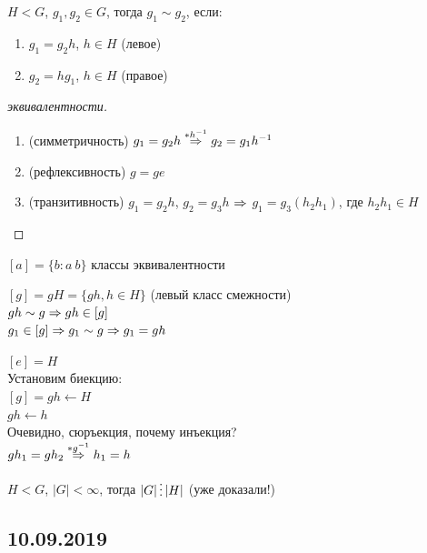 \documentclass[12pt, fleqn]{article}
\begin{document}
\begin{definition}
    $H<G$, $g_1,g_2 \in G$, тогда $g_1 \sim g_2$, если:
    \begin{enumerate}                               
    	\item $g_1=g_2 h$, $h \in H$ (левое)
    	\item $g_2=h g_1$, $h \in H$ (правое)
	\end{enumerate} 
\end{definition}

\begin{proof}[эквивалентности]
    \begin{enumerate}                               
    	\item (симметричность) $g_1=g_2 h \overset{*h^{-1}}{\Rightarrow} g_2 = g_1 h^{-1}$
    	\item (рефлексивность) $g=g e$
    	\item (транзитивность) $g_1=g_2 h$, $g_2 = g_3 h$ $\Rightarrow$ $g_1=g_3(h_2 h_1)$, где $h_2 h_1 \in H$
	\end{enumerate} 
\end{proof}

\begin{definition}
    $[a] = \{b:a ~ b\}$ классы эквивалентности
\end{definition}

\begin{definition}
    $[g] = g H = \{g h, h \in H \}$ (левый класс смежности) 
    \\
    $g h \sim g \Rightarrow g h \in [g]$
    \\
    $g_1 \in [g] \Rightarrow g_1 \sim g \Rightarrow g_1 = g h$
\end{definition}

\begin{utv}
    $[e]=H$
    \\
    Установим биекцию: 
    \\
    $[g]=g h \leftarrow H$
    \\
    $g h \leftarrow h$
    \\
    Очевидно, сюръекция, почему инъекция? 
    \\
    $g h_1 = g h_2 \overset{*g^{-1}}{\Rightarrow} h_1 = h$
\end{utv}

\begin{theorem}[Лагранжа]
$H < G$, $|G| < \infty$, тогда $|G| \devides |H|$ (уже доказали!)
\end{theorem}
\subsection{10.09.2019}
\end{document}
